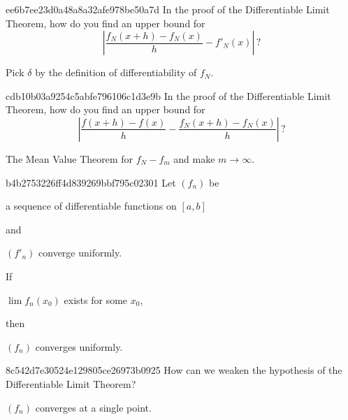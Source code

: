 \begin{note}{ee6b7ee23d0a48a8a32afe978be50a7d}
    In the proof of the Differentiable Limit Theorem, how do you find an upper bound for
    \[
        \left\lvert \frac{f_N(x + h) - f_N(x)}{h} - f'_N(x) \right\rvert\,?
    \]

    \begin{cloze}{1}
        Pick \({ \delta }\) by the definition of differentiability of \({ f_N }\).
    \end{cloze}
\end{note}

\begin{note}{cdb10b03a9254c5abfe796106c1d3e9b}
    In the proof of the Differentiable Limit Theorem, how do you find an upper bound for
    \[
        \left\lvert \frac{f(x + h) - f(x)}{h} - \frac{f_{N}(x + h) - f_N(x)}{h} \right\rvert\,?
    \]

    \begin{cloze}{1}
        The Mean Value Theorem for \({ f_N - f_m }\) and make \({ m \to \infty }\).
    \end{cloze}
\end{note}

\begin{note}{b4b2753226ff4d839269bbf795c02301}
    Let \({ (f_n) }\) be \begin{icloze}{4}a sequence of differentiable functions on \({ [a, b] }\)\end{icloze} and \begin{icloze}{3}\({ (f'_n) }\) converge uniformly.\end{icloze}
    If \begin{icloze}{2}\({ \lim f_n(x_0) }\) exists for some \({ x_0 }\),\end{icloze} then \begin{icloze}{1}\({ (f_n) }\) converges uniformly.\end{icloze}
\end{note}

\begin{note}{8c542d7e30524e129805ce26973b0925}
    How can we weaken the hypothesis of the Differentiable Limit Theorem?

    \begin{cloze}{1}
        \({ (f_n) }\) converges at a single point.
    \end{cloze}
\end{note}

